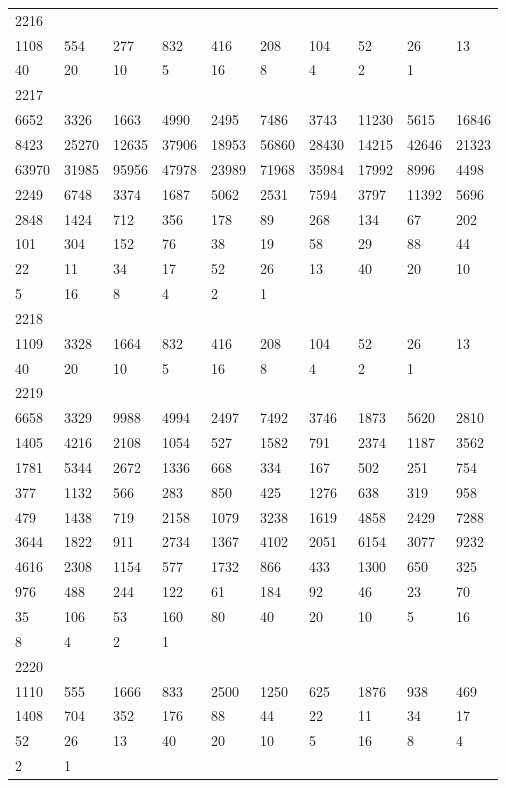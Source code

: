 \begin{longtable}{*{10}{l}}
2216&&&&&&&&&\\
1108& 554& 277& 832& 416& 208& 104& 52& 26& 13\\
40& 20& 10& 5& 16& 8& 4& 2& 1& \\

2217&&&&&&&&&\\
6652& 3326& 1663& 4990& 2495& 7486& 3743& 11230& 5615& 16846\\
8423& 25270& 12635& 37906& 18953& 56860& 28430& 14215& 42646& 21323\\
63970& 31985& 95956& 47978& 23989& 71968& 35984& 17992& 8996& 4498\\
2249& 6748& 3374& 1687& 5062& 2531& 7594& 3797& 11392& 5696\\
2848& 1424& 712& 356& 178& 89& 268& 134& 67& 202\\
101& 304& 152& 76& 38& 19& 58& 29& 88& 44\\
22& 11& 34& 17& 52& 26& 13& 40& 20& 10\\
5& 16& 8& 4& 2& 1& \\

2218&&&&&&&&&\\
1109& 3328& 1664& 832& 416& 208& 104& 52& 26& 13\\
40& 20& 10& 5& 16& 8& 4& 2& 1& \\

2219&&&&&&&&&\\
6658& 3329& 9988& 4994& 2497& 7492& 3746& 1873& 5620& 2810\\
1405& 4216& 2108& 1054& 527& 1582& 791& 2374& 1187& 3562\\
1781& 5344& 2672& 1336& 668& 334& 167& 502& 251& 754\\
377& 1132& 566& 283& 850& 425& 1276& 638& 319& 958\\
479& 1438& 719& 2158& 1079& 3238& 1619& 4858& 2429& 7288\\
3644& 1822& 911& 2734& 1367& 4102& 2051& 6154& 3077& 9232\\
4616& 2308& 1154& 577& 1732& 866& 433& 1300& 650& 325\\
976& 488& 244& 122& 61& 184& 92& 46& 23& 70\\
35& 106& 53& 160& 80& 40& 20& 10& 5& 16\\
8& 4& 2& 1& \\

2220&&&&&&&&&\\
1110& 555& 1666& 833& 2500& 1250& 625& 1876& 938& 469\\
1408& 704& 352& 176& 88& 44& 22& 11& 34& 17\\
52& 26& 13& 40& 20& 10& 5& 16& 8& 4\\
2& 1& \\


\end{longtable}

